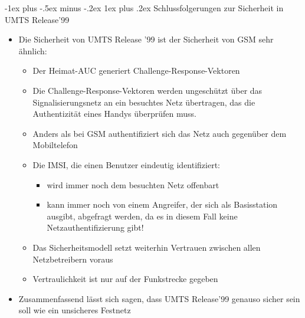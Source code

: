 \documentclass[a4paper]{article}
\makeatletter
\renewcommand{\subsubsection}{\@startsection{subsubsection}{3}{0mm}%
 {-1ex plus -.5ex minus -.2ex}%
 {1ex plus .2ex}%
 {\normalfont\small\bfseries}}
\makeatother
\begin{document}
\begin{multicols}{3}
    \subsubsection{Schlussfolgerungen zur Sicherheit in UMTS
        Release'99}

    \begin{itemize}
        \item
              Die Sicherheit von UMTS Release '99 ist der Sicherheit von GSM sehr
              ähnlich:

              \begin{itemize}
                  \item
                        Der Heimat-AUC generiert Challenge-Response-Vektoren
                  \item
                        Die Challenge-Response-Vektoren werden ungeschützt über das
                        Signalisierungsnetz an ein besuchtes Netz übertragen, das die
                        Authentizität eines Handys überprüfen muss.
                  \item
                        Anders als bei GSM authentifiziert sich das Netz auch gegenüber dem
                        Mobiltelefon
                  \item
                        Die IMSI, die einen Benutzer eindeutig identifiziert:

                        \begin{itemize}
                            \item
                                  wird immer noch dem besuchten Netz offenbart
                            \item
                                  kann immer noch von einem Angreifer, der sich als Basisstation
                                  ausgibt, abgefragt werden, da es in diesem Fall keine
                                  Netzauthentifizierung gibt!
                        \end{itemize}
                  \item
                        Das Sicherheitsmodell setzt weiterhin Vertrauen zwischen allen
                        Netzbetreibern voraus
                  \item
                        Vertraulichkeit ist nur auf der Funkstrecke gegeben
              \end{itemize}
        \item
              Zusammenfassend lässt sich sagen, dass UMTS Release'99 genauso sicher
              sein soll wie ein unsicheres Festnetz
    \end{itemize}



\end{multicols}
\end{document}
